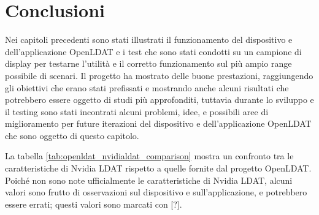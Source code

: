\setlength{\parskip}{1em}
\setlength{\parindent}{0pt}
\chapter{Conclusioni}
\label{chap:outro}

Nei capitoli precedenti sono stati illustrati il funzionamento del dispositivo e dell'applicazione OpenLDAT e i test che sono stati condotti su un campione di display per testarne l'utilità e il corretto funzionamento sul più ampio range possibile di scenari. Il progetto ha mostrato delle buone prestazioni, raggiungendo gli obiettivi che erano stati prefissati e mostrando anche alcuni risultati che potrebbero essere oggetto di studi più approfonditi, tuttavia durante lo sviluppo e il testing sono stati incontrati alcuni problemi, idee, e possibili aree di miglioramento per future iterazioni del dispositivo e dell'applicazione OpenLDAT che sono oggetto di questo capitolo.

La tabella \ref{tab:openldat_nvidialdat_comparison} mostra un confronto tra le caratteristiche di Nvidia LDAT rispetto a quelle fornite dal progetto OpenLDAT. Poiché non sono note ufficialmente le caratteristiche di Nvidia LDAT, alcuni valori sono frutto di osservazioni sul dispositivo e sull'applicazione, e potrebbero essere errati; questi valori sono marcati con [?].


